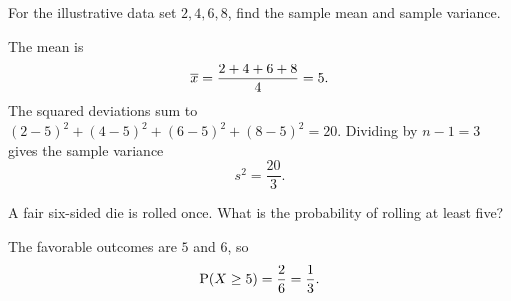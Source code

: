 \documentclass[11pt]{article}
\title{\ProblemSetTitle}
\author{\StudentName \\ \CourseName \\ \InstitutionName}
\date{Due: \DueDate}
\begin{document}
\maketitle

For the illustrative data set $2, 4, 6, 8$, find the sample mean and sample variance.

\begin{solution}
The mean is
\begin{equation*}
  \overline{x} = \frac{2+4+6+8}{4} = 5.
\end{equation*}
The squared deviations sum to $(2-5)^2+(4-5)^2+(6-5)^2+(8-5)^2=20$. Dividing by $n-1=3$ gives the sample variance
\begin{equation*}
  s^2 = \frac{20}{3}.
\end{equation*}
\end{solution}

A fair six-sided die is rolled once. What is the probability of rolling at least five?

\begin{solution}
The favorable outcomes are $5$ and $6$, so
\begin{equation*}
  \operatorname{P}\!\left(X \geq 5\right) = \frac{2}{6} = \frac{1}{3}.
\end{equation*}
\end{solution}
\end{document}
